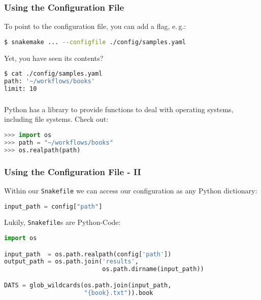 \begin{frame}[fragile]
  \frametitle{Using the Configuration File}
  To point to the configuration file, you can add a flag, e.\,g.:
  \begin{lstlisting}[language=Bash, style=Shell]
$ snakemake ... --configfile ./config/samples.yaml  
  \end{lstlisting}
  Yet, you have seen its contents?
  \begin{lstlisting}[language=Bash, style=Shell]
$ cat ./config/samples.yaml
path: '~/workflows/books'
limit: 10
  \end{lstlisting}
\end{frame} 

\begin{frame}[fragile]
  \frametitle{}
  Python has a library to provide functions to deal with operating systems, including file systems. Check out:
  \begin{lstlisting}[language=Python,style=Python]
>>> import os
>>> path = "~/workflows/books"
>>> os.realpath(path)

  \end{lstlisting}

\end{frame}


\begin{frame}[fragile]
  \frametitle{Using the Configuration File - II}
  Within our \texttt{Snakefile} we can access our configuration as any Python dictionary:
  \begin{lstlisting}[language=Python,style=Python]
input_path = config["path"]
  \end{lstlisting}
  \pause
  Lukily, \texttt{Snakefile}s are Python-Code:
  \begin{lstlisting}[language=Python,style=Python]
import os

input_path  = os.path.realpath(config['path'])
output_path = os.path.join('results', 
                           os.path.dirname(input_path))

DATS = glob_wildcards(os.path.join(input_path, 
                      "{book}.txt")).book
  \end{lstlisting}
  
\end{frame}

